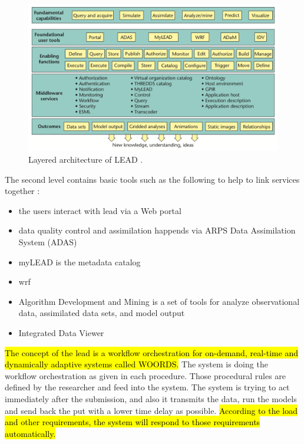 \begin{figure}[htp]
    \centering
    \includegraphics[width=1.0\textwidth]{lit/lead/LEAD-system-Fundamental-capabilities-familiar-to-meteorologists-are-shown-in-the-top_W640.png}
    \caption[Layered architecture of LEAD]{Layered architecture of LEAD \cite{Droegemeier2005Service-OrientedWeather}.}
    \label{fi:lead_system}
\end{figure}

The second level contains basic tools such as the following to help to link services together  \cite{Droegemeier2005Service-OrientedWeather}:
\begin{itemize}
    \item the users interact with \acrshort{lead} via a Web portal
    \item data quality control and assimilation happends via ARPS Data Assimilation System (ADAS)
    \item myLEAD is the metadata catalog
    \item \acrfull{wrf} \cite{MesoscaleMicroscaleMeteorologyLaboratoryWeatherModel}
    \item Algorithm Development and Mining is a set of tools for analyze observational data, assimilated data sets, and model output 
    \item Integrated Data Viewer 
\end{itemize}

\hl{The concept of the \acrshort{lead} is a workflow orchestration for on-demand, real-time and dynamically adaptive systems called WOORDS.} The system is doing the workflow orchestration as given in each procedure. Those procedural rules are defined by the researcher and feed into the system. The system is trying to act immediately after the submission, and also it transmits the data, run the models and send back the put with a lower time delay as possible. \hl{According to the load and other requirements, the system will respond to those requirements automatically.}


